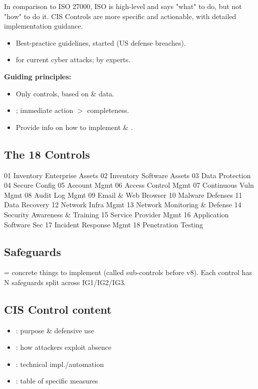 In comparison to ISO 27000, ISO is high-level and says "what" to do, but not "how" to do it. CIS Controls are more specific and actionable, with detailed implementation guidance.
\begin{itemize}
\item Best-practice guidelines, started  (US defense breaches).
\item {} for current cyber attacks; by experts.
\end{itemize}
\textbf{Guiding principles:}
\begin{itemize}
\item Only  controls, based on  \& data.
\item {}; immediate action $>$ completeness.
\item Provide info on how to implement \& .
\end{itemize}

\subsection{The 18 Controls}
{\scriptsize
01 Inventory Enterprise Assets \textbullet{} 02 Inventory Software Assets \textbullet{} 03 Data Protection \textbullet{} 04 Secure Config \textbullet{} 05 Account Mgmt \textbullet{} 06 Access Control Mgmt \textbullet{} 07 Continuous Vuln Mgmt \textbullet{} 08 Audit Log Mgmt \textbullet{} 09 Email \& Web Browser \textbullet{} 10 Malware Defenses \textbullet{} 11 Data Recovery \textbullet{} 12 Network Infra Mgmt \textbullet{} 13 Network Monitoring \& Defense \textbullet{} 14 Security Awareness \& Training \textbullet{} 15 Service Provider Mgmt \textbullet{} 16 Application Software Sec \textbullet{} 17 Incident Response Mgmt \textbullet{} 18 Penetration Testing
}

\subsection{Safeguards}
 = concrete things to implement (called sub-controls before v8). Each control has N safeguards split across IG1/IG2/IG3.

\subsection{CIS Control content}
\begin{itemize}
\item {}: purpose \& defensive use
\item {}: how attackers exploit absence
\item {}: technical impl./automation
\item {}: table of specific measures
\end{itemize}


